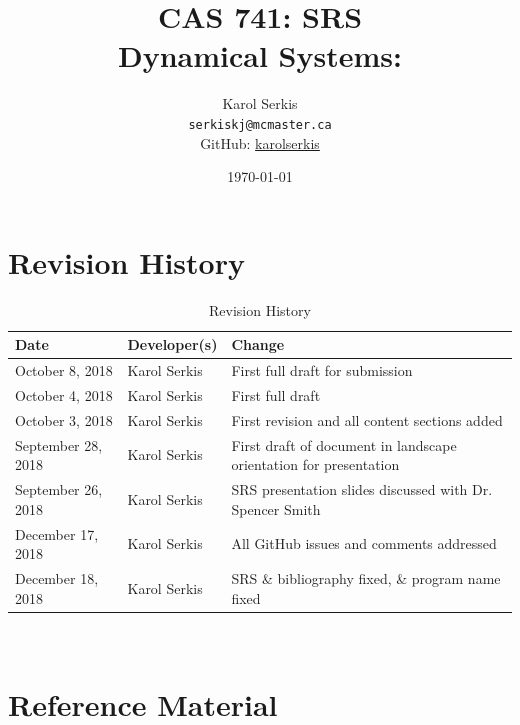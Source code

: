 \documentclass[12pt, titlepage]{article}
\begin{document}

\title{CAS 741: SRS\\[10pt]\Large Dynamical Systems: \progname}
\author{Karol Serkis\\\texttt{serkiskj@mcmaster.ca}\\GitHub:
\href{https://www.github.com/karolserkis}{karolserkis}}
\date{\today}
	
\maketitle

\tableofcontents
\listoffigures

\clearpage

\setcounter{secnumdepth}{0}

\section{Revision History}

\begin{table}[hp]
\caption{Revision History}
\begin{tabularx}{\textwidth}{llX}
\toprule
\textbf{Date} & \textbf{Developer(s)} & \textbf{Change}\\
\midrule
October 8, 2018 & Karol Serkis &  First full draft for submission\\
October 4, 2018 & Karol Serkis &  First full draft\\
October 3, 2018 & Karol Serkis & First revision and all content sections added
\\September 28, 2018 & 
Karol Serkis & First draft of document in landscape
orientation for presentation\\
September 26, 2018 & Karol Serkis & SRS presentation slides discussed with Dr.
Spencer Smith \\
December 17, 2018 & Karol Serkis & All GitHub issues and comments addressed \\
December 18, 2018 & Karol Serkis & SRS \& bibliography fixed, 
\& program name fixed \\
\bottomrule
\end{tabularx}
\end{table}

~\newpage

\section{Reference Material}
\end{document}
